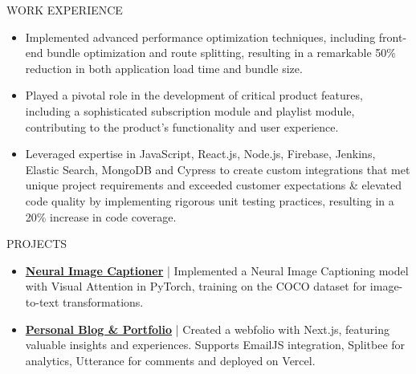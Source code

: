 \documentclass{resume} %
\begin{document}
\begin{rSection}{WORK EXPERIENCE}
   \begin{minipage}[t]{1\textwidth}
      \begin{itemize}[left=0pt, nosep, before=\vspace{-0.5\baselineskip}]
         \item \small Implemented advanced performance optimization techniques, including front-end bundle optimization and route splitting, resulting in a remarkable 50\% reduction in both application load time and bundle size.
         \item \small Played a pivotal role in the development of critical product features, including a sophisticated subscription module and playlist module, contributing to the product's functionality and user experience.
         \item \small Leveraged expertise in JavaScript, React.js, Node.js, Firebase, Jenkins, Elastic Search, MongoDB and Cypress to create custom integrations that met unique project requirements and exceeded customer expectations \& elevated code quality by implementing rigorous unit testing practices, resulting in a 20\% increase in code coverage. 
      \end{itemize}
   \end{minipage}

\end{rSection}

\vspace{-5pt}
\begin{rSection}{PROJECTS}
   \vspace{0.6em}

   \begin{minipage}[t]{1\textwidth}
      \begin{itemize}[left=0pt, nosep, before=\vspace{-0.5\baselineskip}]
         \item \small \textbf{\href{https://github.com/Prajwal-S-Venkatesh/image-captioner}{Neural Image Captioner}} | {Implemented a Neural Image Captioning model with Visual Attention in PyTorch, training on the COCO dataset for image-to-text transformations.}
         \vspace{0.25em}
         \item \small \textbf{\href{https://blog.prajwalsv.dev}{Personal Blog \& Portfolio}} | {Created a webfolio with Next.js, featuring valuable insights and experiences. Supports EmailJS integration, Splitbee for analytics, Utterance for comments and deployed on Vercel. }
      \end{itemize}
   \end{minipage}
   
   \end{rSection} 
      
\end{document}
